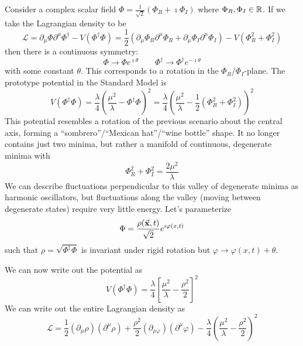 \documentclass[a4paper,twoside,master.tex]{subfiles}
\begin{document}
Consider a complex scalar field $ \Phi = \frac{1}{\sqrt{2}} \left( \Phi_R + \imath \Phi_I \right) $ where $ \Phi_R, \Phi_I \in \mathbb{R} $. If we take the Lagrangian density to be
\begin{equation}
    \mathcal{L} = \partial_{\mu} \Phi \partial^{\mu} \Phi^\dagger - V(\Phi^\dagger \Phi) = \frac{1}{2} \left( \partial_{\mu} \Phi_R \partial^{\mu} \Phi_R + \partial_{\mu} \Phi_I \partial^{\mu} \Phi_I \right) - V(\Phi_R^2 + \Phi_I^2)
\end{equation}
then there is a continuous symmetry:
\begin{equation}
    \Phi \to \Phi e^{\imath \theta} \qquad \Phi^\dagger \to \Phi^\dagger e^{- \imath \theta}
\end{equation}
with some constant $ \theta $. This corresponds to a rotation in the $ \Phi_R $/$ \Phi_I $-plane. The prototype potential in the Standard Model is
\begin{equation}
    V(\Phi^\dagger \Phi) = \frac{\lambda}{4} \left( \frac{\mu^2}{\lambda} - \Phi^\dagger \Phi \right)^2 = \frac{\lambda}{4} \left( \frac{\mu^2}{\lambda} - \frac{1}{2} \left( \Phi_R^2 + \Phi_I^2 \right) \right)^2
\end{equation}
This potential resembles a rotation of the previous scenario about the central axis, forming a ``sombrero''/``Mexican hat''/``wine bottle'' shape. It no longer contains just two minima, but rather a manifold of continuous, degenerate minima with
\begin{equation}
    \Phi_R^2 + \Phi_I^2 = \frac{2 \mu^2}{\lambda}
\end{equation}
We can describe fluctuations perpendicular to this valley of degenerate minima as harmonic oscillators, but fluctuations along the valley (moving between degenerate states) require very little energy. Let's parameterize
\begin{equation}
    \Phi = \frac{\rho(\va{x}, t)}{\sqrt{2}} e^{\imath \varphi(x,t)}
\end{equation}
such that $ \rho = \sqrt{\Phi^\dagger \Phi} $ is invariant under rigid rotation but $ \varphi \to \varphi(x,t) + \theta $.

We can now write out the potential as
\begin{equation}
    V(\Phi^\dagger \Phi) = \frac{\lambda}{4} \left[ \frac{\mu^2}{\lambda} - \frac{\rho^2}{2} \right]^2
\end{equation}
We can write out the entire Lagrangian density as
\begin{equation}
    \mathcal{L} = \frac{1}{2} (\partial_{\mu} \rho)(\partial^{\mu} \rho) + \frac{\rho^2}{2} (\partial_{\mu \varphi})(\partial^{\mu} \varphi) - \frac{\lambda}{4} \left( \frac{\mu^2}{\lambda} - \frac{\rho^2}{2} \right)^2
\end{equation}
\end{document}
